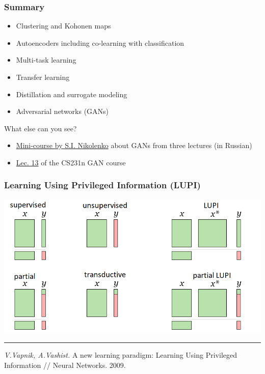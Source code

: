 \documentclass[fullscreen=true, bookmarks=true, hyperref={pdfencoding=unicode}]{beamer}
\begin{document}
\begin{frame}
\frametitle{Summary}
   \begin{itemize}
     \item Clustering and Kohonen maps
     \item Autoencoders including co-learning with classification
     \item Multi-task learning
     \item Transfer learning
     \item Distillation and surrogate modeling
     \item Adversarial networks (GANs)
   \end{itemize}
   \pause
   \vspace{0.5cm}
   What else can you see?
   \begin{itemize}
     \item \href{https://www.lektorium.tv/node/36609}{Mini-course by S.I. Nikolenko} about GANs from three lectures (in Russian)
     \item \href{https://www.youtube.com/watch?v=5WoItGTWV54}{Lec. 13} of the CS231n GAN course
   \end{itemize}
\end{frame}

\begin{frame}
  \frametitle{Learning Using Privileged Information (LUPI)}

  \begin{center}
    \includegraphics[keepaspectratio,
                     width=.8\paperwidth]{LUPI_en.png}
  \end{center}

  \noindent\rule{8cm}{0.4pt}

  {\footnotesize
  {\it V.Vapnik, A.Vashist.} A new learning paradigm: Learning Using Privileged Information // Neural Networks. 2009.}
\end{frame}
\end{document}
